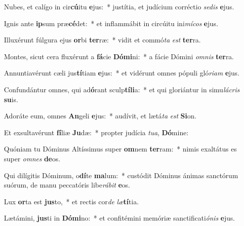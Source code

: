 \item Nubes, et calígo in cir\textbf{cú}itu \textbf{e}jus:~* justítia, et judícium corréctio \textit{se}\textit{dis} \textbf{e}jus.
\item Ignis ante \textbf{ip}sum præ\textbf{cé}det:~* et inflammábit in circúitu ini\textit{mí}\textit{cos} \textbf{e}jus.
\item Illuxérunt fúlgura ejus \textbf{or}bi \textbf{ter}ræ:~* vidit et commó\textit{ta} \textit{est} \textbf{ter}ra.
\item Montes, sicut cera fluxérunt a \textbf{fá}cie \textbf{Dó}\textbf{mi}ni:~* a fácie Dómini \textit{om}\textit{nis} \textbf{ter}ra.
\item Annuntiavérunt cæli jus\textbf{tí}tiam \textbf{e}jus:~* et vidérunt omnes pópuli gló\textit{ri}\textit{am} \textbf{e}jus.
\item Confundántur omnes, qui ad\textbf{ó}rant sculp\textbf{tí}\textbf{li}a:~* et qui gloriántur in simu\textit{lá}\textit{cris} \textbf{su}is.
\item Adoráte eum, omnes \textbf{An}geli \textbf{e}jus:~* audívit, et lætá\textit{ta} \textit{est} \textbf{Si}on.
\item Et exsultavérunt \textbf{fí}liæ \textbf{Ju}dæ:~* propter judícia \textit{tu}\textit{a}, \textbf{Dó}mine:
\item Quóniam tu Dóminus Altíssimus super \textbf{om}nem \textbf{ter}ram:~* nimis exaltátus es super \textit{om}\textit{nes} \textbf{de}os.
\item Qui dilígitis Dóminum, o\textbf{dí}te \textbf{ma}lum:~* custódit Dóminus ánimas sanctórum suórum, de manu peccatóris libe\textit{rá}\textit{bit} \textbf{e}os.
\item Lux \textbf{or}ta est \textbf{jus}to,~* et rectis cor\textit{de} \textit{læ}\textbf{tí}tia.
\item Lætámini, \textbf{jus}ti in \textbf{Dó}\textbf{mi}no:~* et confitémini memóriæ sanctificati\textit{ó}\textit{nis} \textbf{e}jus.
